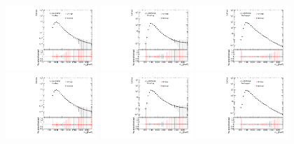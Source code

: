 \begin{figure}[htbp!]
\begin{center}
\includegraphics[width=0.31\textwidth,angle=-90]{figures/boosted/Syst_CRSB/CR_High_compare_FourTag_qcd_hh.pdf}
\includegraphics[width=0.31\textwidth,angle=-90]{figures/boosted/Syst_CRSB/CR_High_compare_ThreeTag_qcd_hh.pdf}
\includegraphics[width=0.31\textwidth,angle=-90]{figures/boosted/Syst_CRSB/CR_High_compare_TwoTag_split_qcd_hh.pdf}
\includegraphics[width=0.31\textwidth,angle=-90]{figures/boosted/Syst_CRSB/CR_Low_compare_FourTag_qcd_hh.pdf}
\includegraphics[width=0.31\textwidth,angle=-90]{figures/boosted/Syst_CRSB/CR_Low_compare_ThreeTag_qcd_hh.pdf}
\includegraphics[width=0.31\textwidth,angle=-90]{figures/boosted/Syst_CRSB/CR_Low_compare_TwoTag_split_qcd_hh.pdf}

\end{center}
\end{figure}
